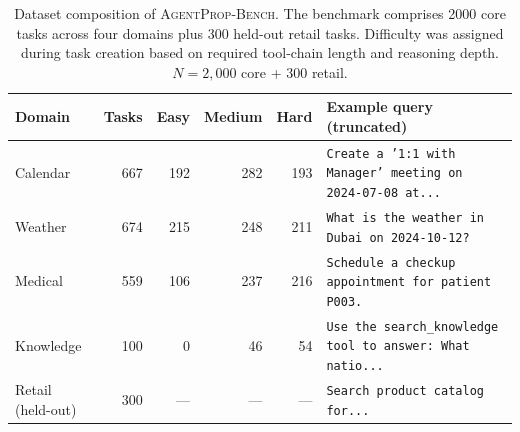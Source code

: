\begin{table}[t]
\centering
\caption{Dataset composition of \textsc{AgentProp-Bench}. The benchmark comprises 2000 core tasks across four domains plus 300 held-out retail tasks. Difficulty was assigned during task creation based on required tool-chain length and reasoning depth. $N = 2{,}000$ core + 300 retail.}
\label{tab:dataset}
\begin{tabular}{l r r r r l}
\toprule
Domain & Tasks & Easy & Medium & Hard & Example query (truncated) \\
\midrule
Calendar & 667 & 192 & 282 & 193 & \texttt{Create a '1:1 with Manager' meeting on 2024-07-08 at...} \\
Weather & 674 & 215 & 248 & 211 & \texttt{What is the weather in Dubai on 2024-10-12?} \\
Medical & 559 & 106 & 237 & 216 & \texttt{Schedule a checkup appointment for patient P003.} \\
Knowledge & 100 & 0 & 46 & 54 & \texttt{Use the search\_knowledge tool to answer:  What natio...} \\
\midrule
Retail (held-out) & 300 & --- & --- & --- & \texttt{Search product catalog for...} \\
\bottomrule
\end{tabular}
\end{table}